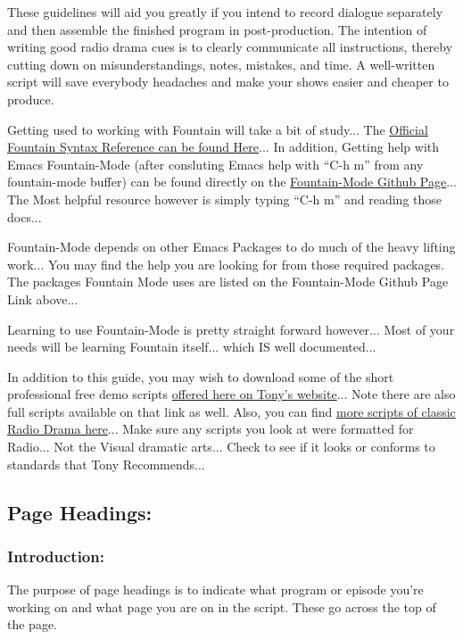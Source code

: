 \documentclass[openleft,oneside,showtrims]{memoir}
\begin{document}
These guidelines will aid you greatly if you intend to record dialogue separately and then assemble the finished program in post-production. The intention of writing good radio drama cues is to clearly communicate all instructions, thereby cutting down on misunderstandings, notes, mistakes, and time. A well-written script will save everybody headaches and make your shows easier and cheaper to produce.

Getting used to working with Fountain will take a bit of study... The \href{https://fountain.io/syntax}{Official Fountain Syntax Reference can be found Here}... In addition, Getting help with Emacs Fountain-Mode (after consluting Emacs help with ``C-h m'' from any fountain-mode buffer) can be found directly on the \href{https://github.com/rnkn/fountain-mode}{Fountain-Mode Github Page}... The Most helpful resource however is simply typing ``C-h m'' and reading those docs... 

Fountain-Mode depends on other Emacs Packages to do much of the heavy lifting work... You may find the help you are looking for from those required packages.  The packages Fountain Mode uses are listed on the Fountain-Mode Github Page Link above...

Learning to use Fountain-Mode is pretty straight forward however... Most of your needs will be learning Fountain itself... which IS well documented...

In addition to this guide, you may wish to download some of the short professional free demo scripts \href{https://www.ruyasonic.com/em\_scripts.htm}{offered here on Tony's website}...  Note there are also full scripts available on that link as well.  Also, you can find \href{http://www.genericradio.com/}{more scripts of classic Radio Drama here}... Make sure any scripts you look at were formatted for Radio... Not the Visual dramatic arts... Check to see if it looks or conforms to standards that Tony Recommends...


\subsection{Page Headings:}
\label{sec:orgefe2f92}
\subsubsection*{Introduction:}
\label{sec:orgda3571b}

The purpose of page headings is to indicate what program or episode you're working on and what page you are on in the script. These go across the top of the page.
\end{document}
